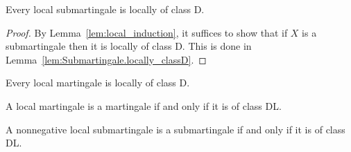 \begin{lemma}\label{lem:IsLocalSubmartingale.locally_classD}
Every local submartingale is locally of class D.
\end{lemma}

\begin{proof}
By Lemma~\ref{lem:local_induction}, it suffices to show that if $X$ is a submartingale then it is locally of class D.
This is done in Lemma~\ref{lem:Submartingale.locally_classD}.
\end{proof}


\begin{lemma}\label{lem:IsLocalMartingale.locally_classD}
Every local martingale is locally of class D.
\end{lemma}




\begin{lemma}\label{lem:IsLocalMartingale.martingale_iff_classDL}
A local martingale is a martingale if and only if it is of class DL.
\end{lemma}




\begin{lemma}\label{lem:IsLocalSubmartingale.submartingale_iff_classDL_of_nonnegative}
A nonnegative local submartingale is a submartingale if and only if it is of class DL.
\end{lemma}


